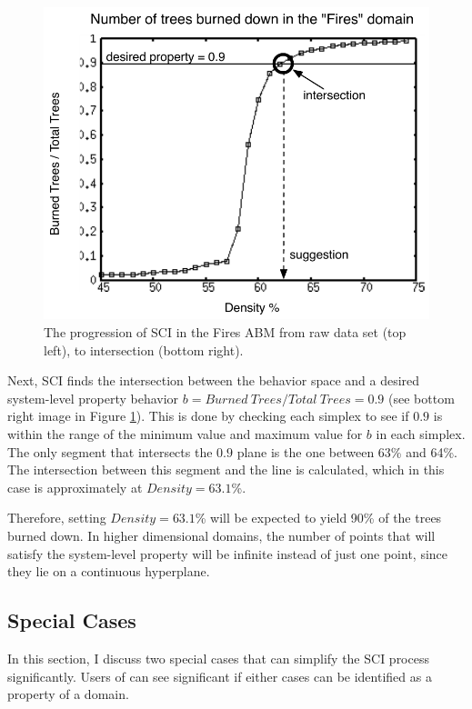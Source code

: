\begin{figure}[ht]
\includegraphics[scale=.5]{images/rii5.pdf}
\caption{The progression of SCI in the Fires ABM from raw data set (top left), to intersection (bottom right). }
\label{fig:rii}
\end{figure}

Next, SCI finds the intersection between the behavior space and a desired system-level property behavior $b = Burned~{ }Trees / Total~{ }Trees = 0.9$ (see bottom right image in Figure \ref{fig:rii}).
This is done by checking each simplex to see if $0.9$ is within the range of the minimum value and maximum value for $b$ in each simplex.
The only segment that intersects the $0.9$ plane is the one between 63\% and 64\%.
The intersection between this segment and the line is calculated, which in this case is approximately at $Density = 63.1$\%.

Therefore, setting $Density = 63.1$\% will be expected to yield 90\% of the trees burned down.
In higher dimensional domains, the number of points that will satisfy the system-level property will be infinite instead of just one point, since they lie on a continuous hyperplane.

\subsection{Special Cases}

In this section, I discuss two special cases that can simplify the SCI process significantly.
Users of \fw can see significant if either cases can be identified as a property of a domain.


